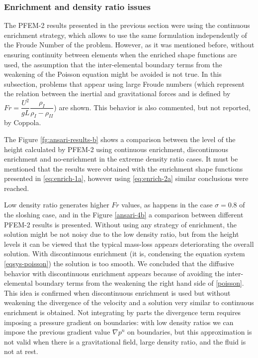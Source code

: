 \subsubsection{Enrichment and density ratio issues}

The PFEM-2 results presented in the previous section were using the continuous enrichment strategy, which allows to use the same formulation independently of the Froude Number of the problem. However, as it was mentioned before, without ensuring continuity between elements when the enriched shape functions are used, the assumption that the inter-elemental boundary terms from the weakening of the Poisson equation might be avoided is not true. In this subsection, problems that appear using large Froude numbers (which represent the relation between the inertial and gravitational forces and is defined by $Fr = \dfrac{U^2}{gL}\dfrac{\rho_I}{\rho_I-\rho_{II}}$) are shown. This behavior is also commented, but not reported, by Coppola\cite{Coppola05}. 

The Figure \ref{fg:ansari-results-b} shows a comparison between the level of the height calculated by PFEM-2 using continuous enrichment, discontinuous enrichment and no-enrichment in the extreme density ratio cases. It must be mentioned that the results were obtained with the enrichment shape functions presented in \ref{eq:enrich-1a}, however using \ref{eq:enrich-2a} similar conclusions were reached.

Low density ratio generates higher $Fr$ values, as happens in the case $\sigma=0.8$ of the sloshing case, and in the Figure \ref{ansari-4b} a comparison between different PFEM-2 results is presented. Without using any strategy of enrichment, the solution might be not noisy due to the low density ratio, but from the height levels it can be viewed that the typical mass-loss appears deteriorating the overall solution. With discontinuous enrichment (it is, condensing the equation system \ref{eqsys-poisson}) the solution is too smooth. We concluded that the diffusive behavior with discontinuous enrichment appears because of avoiding the inter-elemental boundary terms from the weakening the right hand side of \ref{poisson}. This idea is confirmed when discontinuous enrichment is used but without weakening the divergence of the velocity and a solution very similar to continuous enrichment is obtained. Not integrating by parts the divergence term requires imposing a pressure gradient on boundaries: with low density ratios we can impose the previous gradient value $\nabla p^n$ on boundaries, but this approximation is not valid when there is a gravitational field, large density ratio, and the fluid is not at rest.

